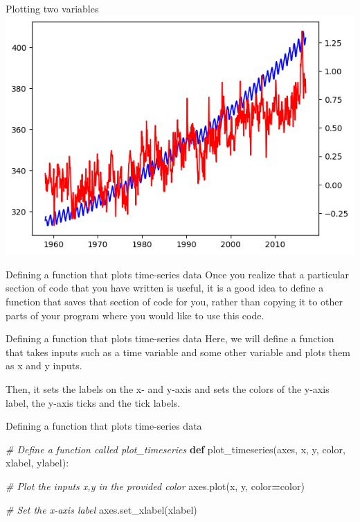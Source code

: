 \documentclass[
  ignorenonframetext,
]{beamer}
\newenvironment{Shaded}{\begin{snugshade}}{\end{snugshade}}
\newcommand{\CommentTok}[1]{\textcolor[rgb]{0.56,0.35,0.01}{\textit{#1}}}
\newcommand{\KeywordTok}[1]{\textcolor[rgb]{0.13,0.29,0.53}{\textbf{#1}}}
\newcommand{\NormalTok}[1]{#1}
\newcommand{\OperatorTok}[1]{\textcolor[rgb]{0.81,0.36,0.00}{\textbf{#1}}}
\begin{document}
\begin{frame}{Plotting two variables}
\label{plotting-two-variables-5}
\includegraphics{../images/im235.png}
\end{frame}

\begin{frame}{Defining a function that plots time-series data}
\label{defining-a-function-that-plots-time-series-data}
Once you realize that a particular section of code that you have written
is useful, it is a good idea to define a function that saves that
section of code for you, rather than copying it to other parts of your
program where you would like to use this code.
\end{frame}

\begin{frame}{Defining a function that plots time-series data}
\label{defining-a-function-that-plots-time-series-data-1}
Here, we will define a function that takes inputs such as a time
variable and some other variable and plots them as x and y inputs.

Then, it sets the labels on the x- and y-axis and sets the colors of the
y-axis label, the y-axis ticks and the tick labels.
\end{frame}

\begin{frame}[fragile]{Defining a function that plots time-series data}
\label{defining-a-function-that-plots-time-series-data-2}

\begin{Shaded}
\begin{Highlighting}[]
\CommentTok{\# Define a function called plot\_timeseries}
\KeywordTok{def}\NormalTok{ plot\_timeseries(axes, x, y, color, xlabel, ylabel):}

  \CommentTok{\# Plot the inputs x,y in the provided color}
\NormalTok{  axes.plot(x, y, color}\OperatorTok{=}\NormalTok{color)}

  \CommentTok{\# Set the x{-}axis label}
\NormalTok{  axes.set\_xlabel(xlabel)}
\end{Highlighting}
\end{Shaded}
\end{frame}
\end{document}
